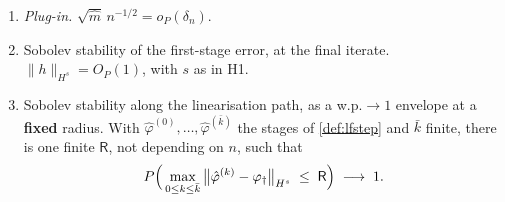 \begin{assumption}
\begin{enumerate}
\item[(v)] \emph{Plug-in.} $\sqrt{\hat m}\,n^{-1/2}=o_P(\delta_n)$.
\item[(vi)] Sobolev stability of the first-stage error, at the final iterate.
$\|h\|_{H^{s}}=O_P(1)$, with $s$ as in H1.
\item[(vi$'$)] Sobolev stability along the linearisation path, as a w.p.$\to1$ envelope at a
\textbf{fixed} radius. With $\hat\varphi^{(0)},\dots,\hat\varphi^{(\bar k)}$ the stages of
\cref{def:lfstep} and $\bar k$ finite, there is one finite $\mathsf R$, not depending on $n$, such that
\[
P\Big(\max_{0\le k\le\bar k}\big\|\hat\varphi^{(k)}-\varphi_{\dagger}\big\|_{H^{s}}\;\le\;\mathsf R\Big)
\;\longrightarrow\;1 .
\]
\end{enumerate}
\end{assumption}


